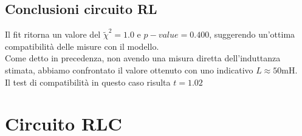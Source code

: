 \documentclass[letterpaper,12pt]{article}
\begin{document}
\subsection{Conclusioni circuito RL}

Il fit ritorna un valore del $\widetilde{\chi}^2 = 1.0$ e $p-value = 0.400$, suggerendo un'ottima compatibilità delle misure con il modello.\\
Come detto in precedenza, non avendo una misura diretta dell'induttanza stimata, abbiamo confrontato il valore ottenuto con uno indicativo $L \approx 50 \text{mH}$.\\
Il test di compatibilità in questo caso risulta $t = 1.02$

\section{Circuito RLC}
\end{document}
